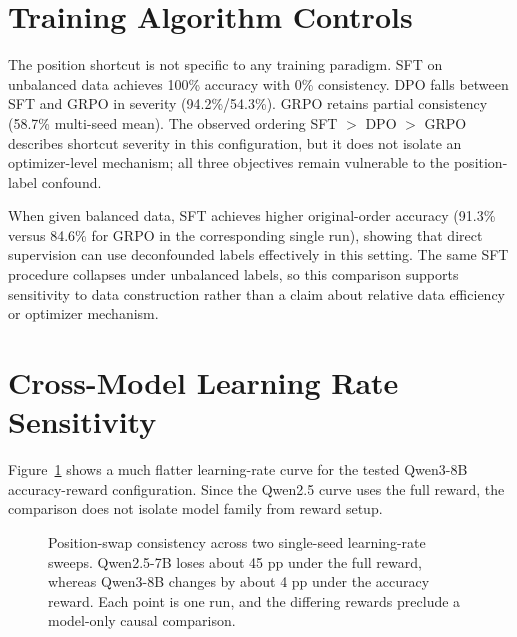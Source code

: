 \documentclass[letterpaper]{article}
\begin{document}
\section{Training Algorithm Controls}
\label{app:sft}

The position shortcut is not specific to any training paradigm. SFT on unbalanced data achieves 100\% accuracy with 0\% consistency. DPO falls between SFT and GRPO in severity (94.2\%/54.3\%). GRPO retains partial consistency (58.7\% multi-seed mean). The observed ordering SFT $>$ DPO $>$ GRPO describes shortcut severity in this configuration, but it does not isolate an optimizer-level mechanism; all three objectives remain vulnerable to the position-label confound.

When given balanced data, SFT achieves higher original-order accuracy (91.3\% versus 84.6\% for GRPO in the corresponding single run), showing that direct supervision can use deconfounded labels effectively in this setting. The same SFT procedure collapses under unbalanced labels, so this comparison supports sensitivity to data construction rather than a claim about relative data efficiency or optimizer mechanism.

\section{Cross-Model Learning Rate Sensitivity}
\label{app:crosslr}

Figure~\ref{fig:crosslr} shows a much flatter learning-rate curve for the tested Qwen3-8B accuracy-reward configuration. Since the Qwen2.5 curve uses the full reward, the comparison does not isolate model family from reward setup.

\begin{figure}[H]
\centering
{}
\caption{Position-swap consistency across two single-seed learning-rate sweeps. Qwen2.5-7B loses about 45 pp under the full reward, whereas Qwen3-8B changes by about 4 pp under the accuracy reward. Each point is one run, and the differing rewards preclude a model-only causal comparison.}
\label{fig:crosslr}
\end{figure}
\end{document}
